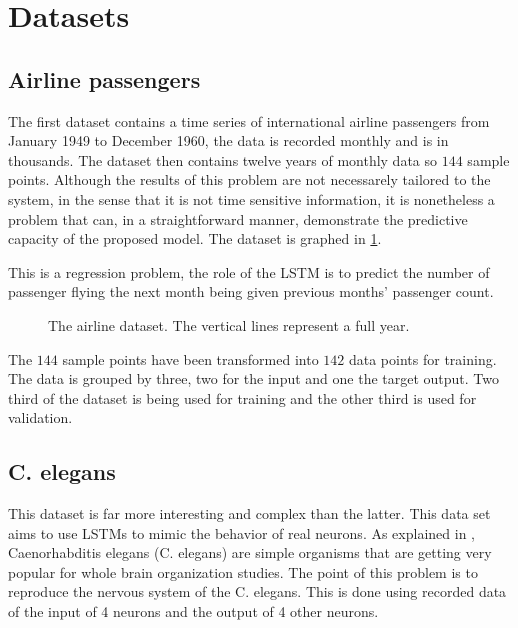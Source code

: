 \section{Datasets}

\subsection{Airline passengers}

The first dataset contains a time series of international airline passengers from January 1949 to December 1960, the data is recorded monthly and is in thousands. The dataset then contains twelve years of monthly data so $144$ sample points. Although the results of this problem are not necessarely tailored to the system, in the sense that it is not time sensitive information, it is nonetheless a problem that can, in a straightforward manner, demonstrate the predictive capacity of the proposed model. The dataset is graphed in \cref{graph:airline}.

This is a regression problem, the role of the \ac{LSTM} is to predict the number of passenger flying the next month being given previous months' passenger count.

\begin{figure}[b]
  \centering
  
  \caption{The airline dataset. The vertical lines represent a full year.}
  \label{graph:airline}
\end{figure}

The $144$ sample points have been transformed into $142$ data points for training. The data is grouped by three, two for the input and one the target output. Two third of the dataset is being used for training and the other third is used for validation.

\subsection{C. elegans}

This dataset is far more interesting and complex than the latter. This data set aims to use \acp{LSTM} to mimic the behavior of real neurons. As explained in \cite{celegans}, Caenorhabditis elegans (C. elegans)  are simple organisms that are getting very popular for whole brain organization studies. The point of this problem is to reproduce the nervous system of the \ac{C. elegans}. This is done using recorded data of the input of 4 neurons and the output of 4 other neurons.

